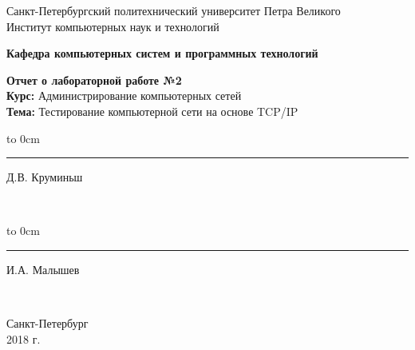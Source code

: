 	\begin{titlepage}
		\begin{center}
			\large {Санкт-Петербургский политехнический университет Петра Великого\\
				Институт компьютерных наук и технологий}\\
		\end{center}
		\begin{center}
			\large\textbf {Кафедра компьютерных систем и программных технологий}
		\end{center}
		\vfill
		\begin{center}
			\large{\textbf{Отчет о лабораторной работе №2} \\
			\textbf{Курс: } Администрирование компьютерных сетей\\
			\textbf{Тема: } Тестирование компьютерной сети на основе TCP/IP}
		\end{center}
		
		\vfill
		
		\hfill\parbox{9 cm}{\hspace*{3cm}\hbox to 0cm{\raisebox{-1em}{\small(подпись)}}\hspace*{-0.8cm}\rule{3cm}{0.8pt} Д.В. Круминьш}\\[0.6cm]
		
		 \hfill\parbox{9 cm}{\hspace*{3cm}\hbox to 0cm{\raisebox{-1em}{\small(подпись)}}\hspace*{-0.8cm}\rule{3cm}{0.8pt} И.А. Малышев}\\[0.6cm]
		
		\vspace{\fill}
		\begin{center}
			Санкт-Петербург \\ 2018 г.
		\end{center}
	\end{titlepage}
\setcounter{page}{2}